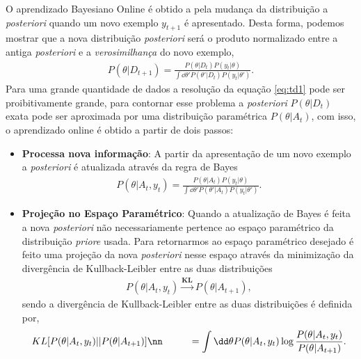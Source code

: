O aprendizado  Bayesiano Online é obtido a pela mudança da distribuição a
\textit{posteriori} quando um novo exemplo $y_{t + 1}$ é apresentado. Desta
forma, podemos mostrar que a nova distribuição \textit{posteriori} será o
produto normalizado entre a antiga \textit{posteriori} e a
\textit{verosimilhança} do novo exemplo, 
\begin{align}
    P(\theta|D_{t+1}) = 
        \frac{P(\theta|D_t)P(y_t|\theta)}
        {\int \dd \theta' P(\theta'|D_t)P(y_t|\theta')}.
    \label{eq:td1}
\end{align}
Para uma grande quantidade de dados a resolução da equação
\ref{eq:td1} pode ser proibitivamente grande, para contornar esse problema
a \textit{posteriori} $P(\theta|D_t)$ exata pode ser aproximada por uma
distribuição paramétrica $P(\theta|A_t)$, com isso, o aprendizado online
é obtido a partir de dois passos:
\begin{itemize}
    \item 
        \textbf{Processa nova informação}: A partir da apresentação de um
        novo exemplo a \textit{posteriori} é atualizada através da regra
        de Bayes
        \begin{align}
            P(\theta|A_t , y_t) = 
            \frac{P(\theta|A_t)P(y_t|\theta)}
            {\int \dd \theta' 
            P(\theta'|A_t)P(y_t|\theta')}.
            \label{eq:td2}
        \end{align}
    \item
        \textbf{Projeção no Espaço Paramétrico}: Quando a atualização de
        Bayes é feita a nova \textit{posteriori} não necessariamente pertence
        ao espaço paramétrico da distribuição \textit{priore} usada. Para
        retornarmos ao espaço paramétrico desejado é feito uma projeção
        da nova \textit{posteriori} nesse espaço através da minimização da
        divergência de Kullback-Leibler entre as duas distribuições
        \begin{align}
            P(\theta|A_t , y_t) 
            \xrightarrow{\mathbf{KL}} 
            P(\theta|A_{t + 1}),
        \end{align}
        sendo a divergência de Kullback-Leibler entre as duas distribuições
        é definida por,
        \begin{align}
            & KL[ P(\theta|A_t , y_t)||P(\theta|A_{t + 1}) ] \nn
            &\qquad =  \int \dd \theta P(\theta|A_t , y_t)
            \log \frac{P(\theta|A_t , y_t)}{P(\theta|A_{t + 1})}.
            \label{eq:kl1}
        \end{align}
\end{itemize}

